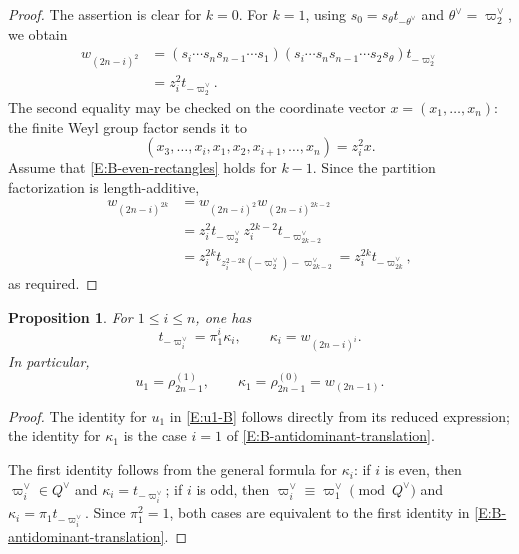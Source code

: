 \documentclass[a4paper]{amsart}
\newtheorem{prop}[thm]{Proposition}
\theoremstyle{remark}
\numberwithin{equation}{section}
\begin{document}
{\begin{proof}
The assertion is clear for $k=0$.  For $k=1$, using
$s_0=s_\theta t_{-\theta^\lor}$ and
$\theta^\lor=\varpi_2^\lor$, we obtain
\begin{align*}
  w_{(2n-i)^2}
  &=(s_i\dotsm s_ns_{n-1}\dotsm s_1)
    (s_i\dotsm s_ns_{n-1}\dotsm s_2s_\theta)
    t_{-\varpi_2^\lor} \\
  &=z_i^2t_{-\varpi_2^\lor}.
\end{align*}
The second equality may be checked on the coordinate vector
$x=(x_1,\ldots,x_n)$: the finite Weyl group factor sends it to
\[
  (x_3,\ldots,x_i,x_1,x_2,x_{i+1},\ldots,x_n)=z_i^2x.
\]
Assume that \eqref{E:B-even-rectangles} holds for $k-1$.  Since the
partition factorization is length-additive,
\begin{align*}
  w_{(2n-i)^{2k}}
  &=w_{(2n-i)^2}w_{(2n-i)^{2k-2}} \\
  &=z_i^2t_{-\varpi_2^\lor}
    z_i^{2k-2}t_{-\varpi_{2k-2}^\lor} \\
  &=z_i^{2k}
    t_{z_i^{2-2k}(-\varpi_2^\lor)-\varpi_{2k-2}^\lor}
   =z_i^{2k}t_{-\varpi_{2k}^\lor},
\end{align*}
as required.
\end{proof}

\begin{prop}
\label{P:B-kappa}
For $1\leq i\leq n$, one has
\begin{equation}
\label{E:B-antidominant-translation}
  t_{-\varpi_i^\lor}=\pi_1^i\kappa_i,
  \qquad
  \kappa_i=w_{(2n-i)^i}.
\end{equation}
In particular,
\begin{equation}
\label{E:u1-B}
  u_1=\rho_{2n-1}^{(1)},
  \qquad
  \kappa_1=\rho_{2n-1}^{(0)}=w_{(2n-1)}.
\end{equation}
\end{prop}

\begin{proof}
The identity for $u_1$ in \eqref{E:u1-B} follows directly from its reduced
expression; the identity for $\kappa_1$ is the case $i=1$ of
\eqref{E:B-antidominant-translation}.

The first identity follows from the general formula for $\kappa_i$: if $i$
is even, then $\varpi_i^\lor\in Q^\lor$ and
$\kappa_i=t_{-\varpi_i^\lor}$; if $i$ is odd, then
$\varpi_i^\lor\equiv\varpi_1^\lor\pmod{Q^\lor}$ and
$\kappa_i=\pi_1t_{-\varpi_i^\lor}$.  Since $\pi_1^2=1$, both cases are
equivalent to the first identity in \eqref{E:B-antidominant-translation}.


\end{proof}}
\end{document}
